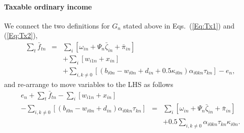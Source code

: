 \documentclass{report}[fleqn,11pt]
\begin{document}
\paragraph*{Taxable ordinary income}
	We connect the two definitions for $G_n$ stated above in Eqs.~(\ref{Eq:Tx1}) and (\ref{Eq:Tx2}),
	\begin{eqnarray}
		\sum_t \bar{f}_{tn} &=&
		\sum_i [\omega_{in} + \Psi_n\bar\zeta_{in} + \bar{\pi}_{in}]  \nonumber \\
		&& + \sum_i [w_{i1n} + x_{in} ]
		\nonumber\\
		&& + \sum_{i,k\neq 0} [(b_{i0n} - w_{i0n} + d_{in}
		     + 0.5\kappa_{i0n})\alpha_{i0kn}\tau_{kn}] - e_n,
	\end{eqnarray}
	and re-arrange to move variables to the LHS as follows
	\begin{eqnarray}
		\label{Eq:C6}
		e_n + \sum_t \bar{f}_{tn}
		- \sum_i [ w_{i1n} + x_{in}] &&
		\nonumber \\
		- \sum_{i,k\neq 0} [(b_{i0n} - w_{i0n} + d_{in})\alpha_{i0kn}\tau_{kn}] &=&
		\sum_i [\omega_{in} + \Psi_n\bar\zeta_{in} + \bar{\pi}_{in} ]
		\nonumber \\
		&& + 0.5\sum_{i,k\neq 0} \alpha_{i0kn}\tau_{kn}\kappa_{i0n}.
	\end{eqnarray}
\end{document}
